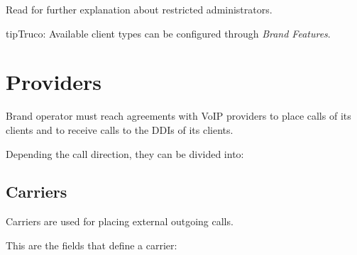 \documentclass[letterpaper,10pt,spanish]{sphinxmanual}
\begin{document}
Read {\hyperref[api_rest/acls:acls]{}} for further explanation about restricted administrators.

\begin{notice}{tip}{Truco:}
Available client types can be configured through \emph{Brand Features}.
\end{notice}


\section{Providers}
\label{administration_portal/brand/providers/index::doc}\label{administration_portal/brand/providers/index:providers}
Brand operator must reach agreements with VoIP providers to place calls of its clients and to receive calls to the
DDIs of its clients.

Depending the call direction, they can be divided into:


\subsection{Carriers}
\label{administration_portal/brand/providers/carriers:id1}\label{administration_portal/brand/providers/carriers::doc}\label{administration_portal/brand/providers/carriers:carriers}
Carriers are used for placing external outgoing calls.

This are the fields that define a carrier:
\end{document}
